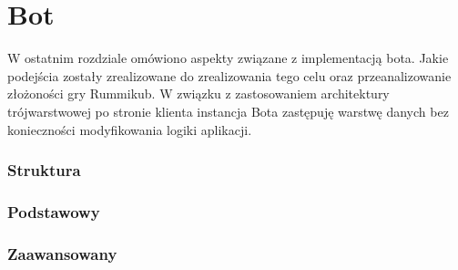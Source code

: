 \chapter{Bot}
\thispagestyle{chapterBeginStyle}

W ostatnim rozdziale omówiono aspekty związane z implementacją bota. Jakie podejścia zostały zrealizowane do zrealizowania tego celu oraz przeanalizowanie złożoności gry Rummikub. W związku z zastosowaniem architektury trójwarstwowej po stronie klienta instancja Bota zastępuję warstwę danych bez konieczności modyfikowania logiki aplikacji.

\subsection{Struktura}


\subsection{Podstawowy}



\subsection{Zaawansowany}



